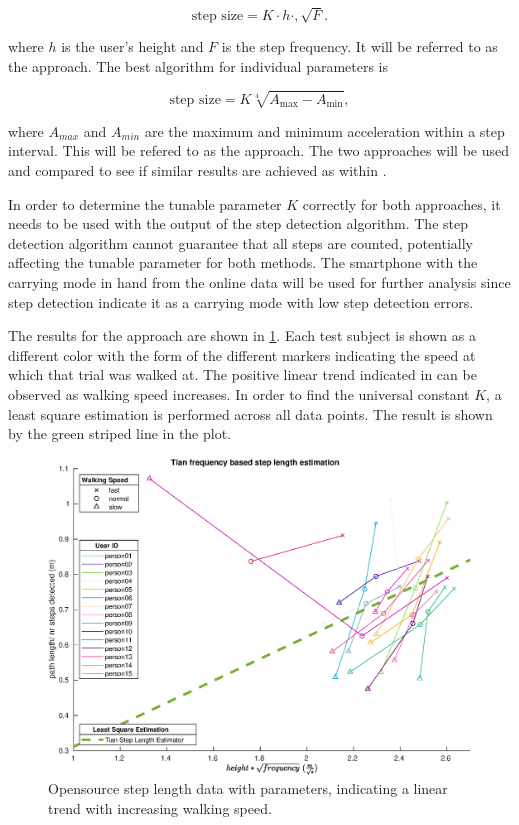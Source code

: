 \begin{equation}
	\label{eq:Tian2016_sle2}
	\text{step size} = K \cdot h \cdot, \sqrt{F}.
\end{equation}


 where $h$ is the user's height and $F$ is the step frequency. It will be referred to as the \citet{Tian2016} approach. The best algorithm for individual parameters is 
 
 \begin{equation}
 	\text{step size} =K \sqrt[4]{A_{\max }-A_{\min }},
 	\label{eq:weinberg_stepsize2}
 \end{equation}
 
 where $A_{max}$ and $A_{min}$ are the maximum and minimum acceleration within a step interval. This will be refered to as the \citet{Weinberg2002} approach. The two approaches will be used and compared to see if similar results are achieved as within \cite{Vezocnik2019}.

In order to determine the tunable parameter $K$ correctly for both approaches, it needs to be used with the output of the step detection algorithm. The step detection algorithm cannot guarantee that all steps are counted, potentially affecting the tunable parameter for both methods. 
The smartphone with the carrying mode in hand from the online data \cite{Vezocnik2019} will be used for further analysis since step detection indicate it as a carrying mode with low step detection errors. \par

The results for the \citet{Tian2016} approach are shown in \cref{fig:step_length_tian}. Each test subject is shown as a different color with the form of the different markers indicating the speed at which that trial was walked at. The positive linear trend indicated in \cite{Tian2016} can be observed as walking speed increases. In order to find the universal constant $K$, a least square estimation is performed across all data points. The result is shown by the green striped line in the plot. 

	\begin{figure}[H]
	\centering
	\includegraphics[width=0.8\linewidth]{images/20201113_1634_tian}
	\caption{Opensource step length data with \citet{Tian2016} parameters, indicating a linear trend with increasing walking speed.}
	\label{fig:step_length_tian}
	\end{figure}
	
